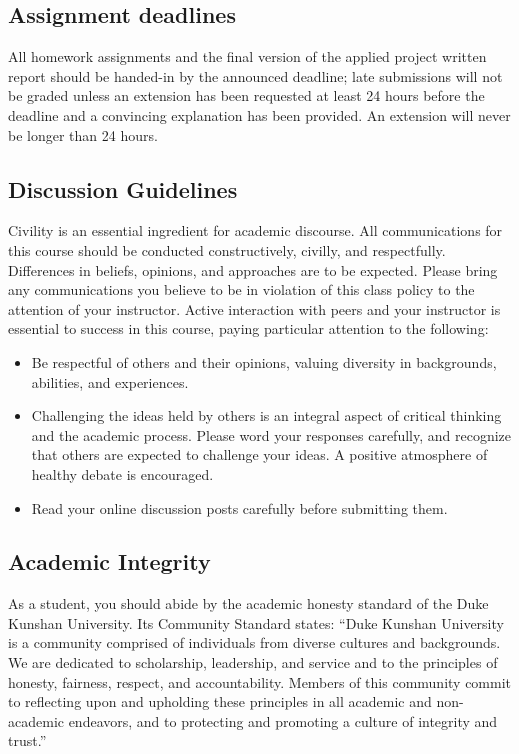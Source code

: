 \documentclass[11pt]{article}
\begin{document}
\subsection{Assignment deadlines}

All homework assignments and the final version of the applied project written report should be handed-in by the announced deadline; late submissions will not be graded unless an extension has been requested at least 24 hours before the deadline and a convincing explanation has been provided. An extension will never be longer than 24 hours. 

\subsection{Discussion Guidelines}

Civility is an essential ingredient for academic discourse. All communications for this course should be conducted constructively, civilly, and respectfully. Differences in beliefs, opinions, and approaches are to be expected. Please bring any communications you believe to be in violation of this class policy to the attention of your instructor. Active interaction with peers and your instructor is essential to success in this course, paying particular attention to the following: 
\begin{itemize}[label={-},noitemsep]
\item Be respectful of others and their opinions, valuing diversity in backgrounds, abilities, and experiences.  
\item Challenging the ideas held by others is an integral aspect of critical thinking and the academic process. Please word your responses carefully, and recognize that others are expected to challenge your ideas. A positive atmosphere of healthy debate is encouraged.  
\item Read your online discussion posts carefully before submitting them. 
\end{itemize}

\subsection{Academic Integrity}

As a student, you should abide by the academic honesty standard of the Duke Kunshan University. Its Community Standard states: ``Duke Kunshan University is a community comprised of individuals from diverse cultures and backgrounds.  We are dedicated to scholarship, leadership, and service and to the principles of honesty, fairness, respect, and accountability. Members of this community commit to reflecting upon and upholding these principles in all academic and non-academic endeavors, and to protecting and promoting a culture of integrity and trust.''
\end{document}
